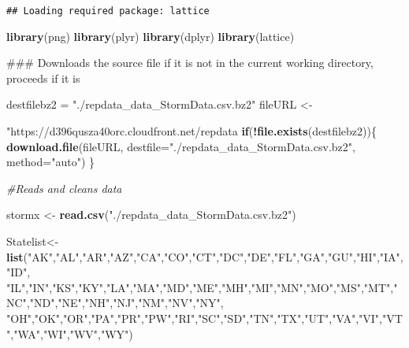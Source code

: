 \documentclass[]{article}
\newenvironment{Shaded}{\begin{snugshade}}{\end{snugshade}}
\newcommand{\KeywordTok}[1]{\textcolor[rgb]{0.13,0.29,0.53}{\textbf{#1}}}
\newcommand{\DataTypeTok}[1]{\textcolor[rgb]{0.13,0.29,0.53}{#1}}
\newcommand{\StringTok}[1]{\textcolor[rgb]{0.31,0.60,0.02}{#1}}
\newcommand{\CommentTok}[1]{\textcolor[rgb]{0.56,0.35,0.01}{\textit{#1}}}
\newcommand{\ControlFlowTok}[1]{\textcolor[rgb]{0.13,0.29,0.53}{\textbf{#1}}}
\newcommand{\OperatorTok}[1]{\textcolor[rgb]{0.81,0.36,0.00}{\textbf{#1}}}
\newcommand{\NormalTok}[1]{#1}
\begin{document}
\begin{verbatim}
## Loading required package: lattice
\end{verbatim}

\begin{Shaded}
\begin{Highlighting}[]
\KeywordTok{library}\NormalTok{(png)}
\KeywordTok{library}\NormalTok{(plyr)}
\KeywordTok{library}\NormalTok{(dplyr)}
\KeywordTok{library}\NormalTok{(lattice) }

\NormalTok{### Downloads the source file if it is not in the current working directory, proceeds if it is }

\NormalTok{destfilebz2 =}\StringTok{ "./repdata_data_StormData.csv.bz2"}
\NormalTok{fileURL <-}\StringTok{ "https://d396qusza40orc.cloudfront.net/repdata%2Fdata%2FStormData.csv.bz2"}
\ControlFlowTok{if}\NormalTok{(}\OperatorTok{!}\KeywordTok{file.exists}\NormalTok{(destfilebz2))\{}
  \KeywordTok{download.file}\NormalTok{(fileURL, }\DataTypeTok{destfile=}\StringTok{"./repdata_data_StormData.csv.bz2"}\NormalTok{, }\DataTypeTok{method=}\StringTok{"auto"}\NormalTok{)}
\NormalTok{\}}

\CommentTok{#Reads and cleans data}
  
\NormalTok{stormx <-}\StringTok{ }\KeywordTok{read.csv}\NormalTok{(}\StringTok{"./repdata_data_StormData.csv.bz2"}\NormalTok{)}
  
\NormalTok{Statelist<-}\StringTok{ }\KeywordTok{list}\NormalTok{(}\StringTok{"AK"}\NormalTok{,}\StringTok{"AL"}\NormalTok{,}\StringTok{"AR"}\NormalTok{,}\StringTok{"AZ"}\NormalTok{,}\StringTok{"CA"}\NormalTok{,}\StringTok{"CO"}\NormalTok{,}\StringTok{"CT"}\NormalTok{,}\StringTok{"DC"}\NormalTok{,}\StringTok{"DE"}\NormalTok{,}\StringTok{"FL"}\NormalTok{,}\StringTok{"GA"}\NormalTok{,}\StringTok{"GU"}\NormalTok{,}\StringTok{"HI"}\NormalTok{,}\StringTok{"IA"}\NormalTok{,}\StringTok{"ID"}\NormalTok{, }\StringTok{"IL"}\NormalTok{,}\StringTok{"IN"}\NormalTok{,}\StringTok{"KS"}\NormalTok{,}\StringTok{"KY"}\NormalTok{,}\StringTok{"LA"}\NormalTok{,}\StringTok{"MA"}\NormalTok{,}\StringTok{"MD"}\NormalTok{,}\StringTok{"ME"}\NormalTok{,}\StringTok{"MH"}\NormalTok{,}\StringTok{"MI"}\NormalTok{,}\StringTok{"MN"}\NormalTok{,}\StringTok{"MO"}\NormalTok{,}\StringTok{"MS"}\NormalTok{,}\StringTok{"MT"}\NormalTok{,}\StringTok{"NC"}\NormalTok{,}\StringTok{"ND"}\NormalTok{,}\StringTok{"NE"}\NormalTok{,}\StringTok{"NH"}\NormalTok{,}\StringTok{"NJ"}\NormalTok{,}\StringTok{"NM"}\NormalTok{,}\StringTok{"NV"}\NormalTok{,}\StringTok{"NY"}\NormalTok{, }\StringTok{"OH"}\NormalTok{,}\StringTok{"OK"}\NormalTok{,}\StringTok{"OR"}\NormalTok{,}\StringTok{"PA"}\NormalTok{,}\StringTok{"PR"}\NormalTok{,}\StringTok{"PW"}\NormalTok{,}\StringTok{"RI"}\NormalTok{,}\StringTok{"SC"}\NormalTok{,}\StringTok{"SD"}\NormalTok{,}\StringTok{"TN"}\NormalTok{,}\StringTok{"TX"}\NormalTok{,}\StringTok{"UT"}\NormalTok{,}\StringTok{"VA"}\NormalTok{,}\StringTok{"VI"}\NormalTok{,}\StringTok{"VT"}\NormalTok{,}\StringTok{"WA"}\NormalTok{,}\StringTok{"WI"}\NormalTok{,}\StringTok{"WV"}\NormalTok{,}\StringTok{"WY"}\NormalTok{)}

}
\end{Highlighting}
\end{Shaded}
\end{document}
